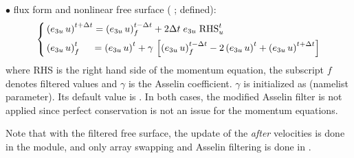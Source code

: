 \documentclass[../main/NEMO_manual]{subfiles}
\begin{document}
$\bullet$ flux form and nonlinear free surface
( ;  defined):
\[
  \left\{
    \begin{aligned}
      &\left(e_{3u}\,u\right)^{t+\Delta t} = \left(e_{3u}\,u\right)_f^{t-\Delta t} + 2\Delta t \; e_{3u} \;\text{RHS}_u^t  	\\
      &\left(e_{3u}\,u\right)_f^t \;\quad = \left(e_{3u}\,u\right)^t
      +\gamma \,\left[ {\left(e_{3u}\,u\right)_f^{t-\Delta t} -2\left(e_{3u}\,u\right)^t+\left(e_{3u}\,u\right)^{t+\Delta t}} \right]
    \end{aligned}
  \right.
\]
where RHS is the right hand side of the momentum equation,
the subscript $f$ denotes filtered values and $\gamma$ is the Asselin coefficient.
$\gamma$ is initialized as  (namelist parameter).
Its default value is .
In both cases, the modified Asselin filter is not applied since perfect conservation is not an issue for
the momentum equations.

Note that with the filtered free surface,
the update of the \textit{after} velocities is done in the  module,
and only array swapping and Asselin filtering is done in .

\biblio

\pindex
\end{document}
